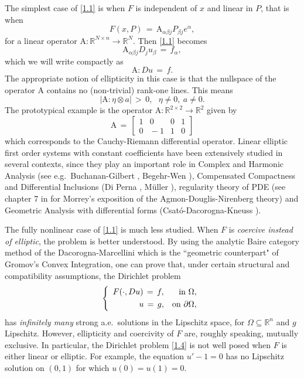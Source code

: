\documentclass{amsart}
\theoremstyle{definition}
\numberwithin{equation}{section}
\begin{document}
The simplest case of \eqref{1.1} is when $F$ is independent of $x$ and linear in $P$, that is when
\[
F(x,P)\, =\, {\textrm{A}}_{{\alpha} {\beta} j} P_{{\beta} j}e^{\alpha},
\]
for a linear operator ${\textrm{A}} : {\mathbb{R}}^{N{\times} n}{\longrightarrow} {\mathbb{R}}^N$. Then \eqref{1.1} becomes
\[
{\textrm{A}}_{{\alpha} {\beta} j} D_ju_{\beta} \,=\, f_{\alpha},
\]
which we will write compactly as
\begin{equation} \label{1.2}
{\textrm{A}}: Du \,=\, f.
\end{equation}
The appropriate notion of ellipticity in this case is that the nullspace of the operator ${\textrm{A}}$ contains no (non-trivial) rank-one lines. This means
\begin{equation}\label{1.3}
|{\textrm{A}} :\eta {\otimes} a | \, >\, 0,\ \ \ \eta \neq 0,  \ a \neq 0.
\end{equation} 
The prototypical example is the operator ${\textrm{A}} : {\mathbb{R}}^{2 {\times} 2} {\longrightarrow} {\mathbb{R}}^2$ given by
\[
{\textrm{A}} \, =\, 
\left[
\begin{array}{cc|cc}
1 & 0 & 0 & 1\\
0 & \!\!\!-1 & 1 & 0 
\end{array}
\right]
\]
which corresponds to the Cauchy-Riemann differential operator. Linear elliptic first order systems with constant coefficients have been extensively studied in several contexts, since they play an important role in  Complex and Harmonic Analysis (see e.g.\ Buchanan-Gilbert \cite{BG}, Begehr-Wen \cite{BW}), Compensated Compactness and Differential Inclusions (Di Perna \cite{DP}, M\"uller \cite{Mu}), regularity theory of PDE (see chapter 7 in \cite{Mo} for Morrey's exposition of the Agmon-Douglis-Nirenberg theory) and Geometric Analysis with differential forms (Csat\'o-Dacorogna-Kneuss \cite{CDK}). 

The fully nonlinear case of \eqref{1.1} is much less studied. When $F$ is \emph{coercive instead of elliptic}, the problem is better understood. By using the analytic Baire category method of the Dacorogna-Marcellini \cite{DM} which is the ``geometric counterpart" of Gromov's Convex Integration, one can prove that, under certain structural and compatibility assumptions, the Dirichlet problem
\begin{equation} \label{1.4}
\left\{
\begin{array}{r}
F(\cdot,Du)\,=\, f, \ \ \ \ \text{ in }{\Omega}, \smallskip\\
u\,=\, g,\ \, \text{ on }{\partial} {\Omega},
\end{array}
\right.
\end{equation}
has \emph{infinitely many} strong a.e.\ solutions in the Lipschitz space, for ${\Omega} {\subseteq} {\mathbb{R}}^n$ and $g$ Lipschitz. However, ellipticity and coercivity of $F$ are, roughly speaking, mutually exclusive. In particular, the Dirichlet problem \eqref{1.4} is not well posed when $F$ is either linear or elliptic. For example, the equation $u'-1=0$ has no Lipschitz solution on $(0,1)$ for which $u(0)=u(1)=0$. 
\end{document}
